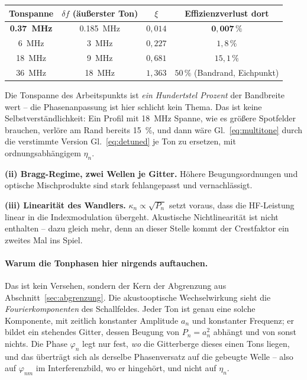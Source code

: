 \documentclass[11pt,a4paper]{article}
\begin{document}
\begin{center}
\begin{tabular}{cccc}
  \toprule
  Tonspanne & $\delta f$ (äußerster Ton) & $\xi$ & Effizienzverlust dort\\
  \midrule
  \textbf{\SI{0.37}{\mega\hertz}} & \SI{0.185}{\mega\hertz} & $0{,}014$ & $\mathbf{0{,}007\,\%}$\\
  \SI{6}{\mega\hertz}  & \SI{3}{\mega\hertz}  & $0{,}227$ & $1{,}8\,\%$\\
  \SI{18}{\mega\hertz} & \SI{9}{\mega\hertz}  & $0{,}681$ & $15{,}1\,\%$\\
  \SI{36}{\mega\hertz} & \SI{18}{\mega\hertz} & $1{,}363$ & $50\,\%$ (Bandrand, Eichpunkt)\\
  \bottomrule
\end{tabular}
\end{center}

\noindent Die Tonspanne des Arbeitspunkts ist \emph{ein Hundertstel Prozent}
der Bandbreite wert -- die Phasenanpassung ist hier schlicht kein Thema. Das
ist keine Selbstverständlichkeit: Ein Profil mit \SI{18}{\mega\hertz} Spanne,
wie es größere Spotfelder brauchen, verlöre am Rand bereits
\SI{15}{\percent}, und dann wäre Gl.~\eqref{eq:multitone} durch die
verstimmte Version Gl.~\eqref{eq:detuned} je Ton zu ersetzen, mit
ordnungsabhängigem $\eta_n$.

\medskip
\noindent\textbf{(ii) Bragg-Regime, zwei Wellen je Gitter.} Höhere
Beugungsordnungen und optische Mischprodukte sind stark fehlangepasst und
vernachlässigt.

\medskip
\noindent\textbf{(iii) Linearität des Wandlers.} $\kappa_n\propto\sqrt{P_n}$
setzt voraus, dass die HF-Leistung linear in die Indexmodulation übergeht.
Akustische Nichtlinearität ist nicht enthalten -- dazu gleich mehr, denn an
dieser Stelle kommt der Crestfaktor ein zweites Mal ins Spiel.

\paragraph{Warum die Tonphasen hier nirgends auftauchen.}
Das ist kein Versehen, sondern der Kern der Abgrenzung aus
Abschnitt~\ref{sec:abgrenzung}. Die akustooptische Wechselwirkung sieht die
\emph{Fourierkomponenten} des Schallfeldes. Jeder Ton ist genau eine solche
Komponente, mit zeitlich konstanter Amplitude $a_n$ und konstanter Frequenz;
er bildet ein stehendes Gitter, dessen Beugung von $P_n = a_n^2$ abhängt und
von sonst nichts. Die Phase $\varphi_n$ legt nur fest, \emph{wo} die
Gitterberge dieses einen Tons liegen, und das überträgt sich als derselbe
Phasenversatz auf die gebeugte Welle -- also auf $\varphi_{nm}$ im
Interferenzbild, wo er hingehört, und nicht auf $\eta_n$.
\end{document}
